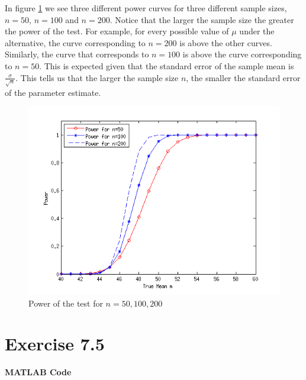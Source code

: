 \documentclass[12pt,a4paper]{article}
\begin{document}
In figure \ref{q7p4 fig1} we see three different power curves for three different sample sizes, $n=50$, $n=100$ and $n=200$. Notice that the larger the sample size the greater the power of the test. For example, for every possible value of $\mu$ under the alternative, the curve corresponding to $n=200$ is above the other curves. Similarly, the curve that corresponds to $n=100$ is above the curve corresponding to $n=50$. This is expected given that the standard error of the sample mean is $\frac{\sigma}{\sqrt{n}}$. This tells us that the larger the sample size $n$, the smaller the standard error of the parameter estimate.

\begin{figure}[ht!]
\begin{center}
\includegraphics[scale=.75]{q7p4_graph.png}
\caption{Power of the test for $n=50,100,200$}
\label{q7p4 fig1}
\end{center}
\end{figure}
\FloatBarrier

\section*{Exercise 7.5}

\textbf{MATLAB Code}
\end{document}
